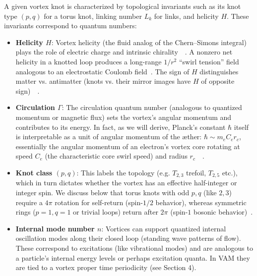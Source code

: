 \documentclass[preprint]{revtex4-2}
\begin{document}
    A given vortex knot is characterized by topological invariants such as its knot type $(p,q)$ for a torus knot, linking number $L_k$ for links, and helicity $H$. These invariants correspond to quantum numbers:
    \begin{itemize}
        \item \textbf{Helicity $H$}: Vortex helicity (the fluid analog of the Chern–Simons integral) plays the role of electric charge and intrinsic chirality~\cite{reference_32}~\cite{reference_33}. A nonzero net helicity in a knotted loop produces a long-range $1/r^2$ “swirl tension” field analogous to an electrostatic Coulomb field~\cite{reference_34}. The sign of $H$ distinguishes matter vs. antimatter (knots vs. their mirror images have $H$ of opposite sign)~\cite{reference_35}~\cite{reference_36}.
        \item \textbf{Circulation $\Gamma$}: The circulation quantum number (analogous to quantized momentum or magnetic flux) sets the vortex’s angular momentum and contributes to its energy. In fact, as we will derive, Planck’s constant $\hbar$ itself is interpretable as a unit of angular momentum of the æther: $\hbar \sim m_e C_e r_c$, essentially the angular momentum of an electron’s vortex core rotating at speed $C_e$ (the characteristic core swirl speed) and radius $r_c$~\cite{reference_37}~\cite{reference_38}.
        \item \textbf{Knot class $(p,q)$}: This labels the topology (e.g. $T_{2,3}$ trefoil, $T_{2,5}$ etc.), which in turn dictates whether the vortex has an effective half-integer or integer spin. We discuss below that torus knots with odd $p,q$ (like $2,3$) require a $4\pi$ rotation for self-return (spin-$1/2$ behavior), whereas symmetric rings ($p=1,q=1$ or trivial loops) return after $2\pi$ (spin-$1$ bosonic behavior)~\cite{reference_39}.
        \item \textbf{Internal mode number $n$}: Vortices can support quantized internal oscillation modes along their closed loop (standing wave patterns of flow). These correspond to excitations (like vibrational modes) and are analogous to a particle’s internal energy levels or perhaps excitation quanta. In VAM they are tied to a vortex proper time periodicity (see Section 4).
    \end{itemize}
\end{document}
